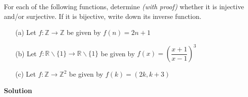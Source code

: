 \documentclass[11pt]{scrartcl}
\theoremstyle{dotlessP}
\theoremstyle{dotlessN}
\begin{document}
\begin{ques}
	 For each of the following functions, determine \emph{(with proof)} whether it is injective and/or surjective. If it is bijective, write down its inverse function. 
    \begin{itemize}
        \item[(a)] Let $f: \mathbb{Z} \to \mathbb{Z}$ be given by $f(n) = 2n+1$
        \item[(b)] Let $f: \mathbb{R} \backslash \{1\} \to \mathbb{R} \backslash \{1\}$ be given by $f(x) = \left( \dfrac{x+1}{x-1}\right)^3$
        \item[(c)] Let $f: \mathbb{Z} \to \mathbb{Z}^2$ be given by $f(k) = (2k,k+3)$
    \end{itemize}
\end{ques}
\textbf{Solution}
\end{document}
